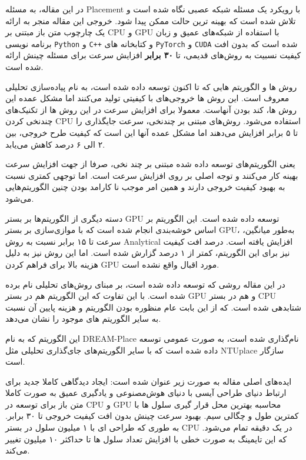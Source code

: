 



در این مقاله، به مسئله Placement با رویکرد یک مسئله شبکه عصبی نگاه شده است و تلاش شده است که بهینه ترین حالت ممکن پیدا شود. خروجی این مقاله منجر به ارائه یک چارچوب متن باز مبتنی بر CPU و GPU با استفاده از شبکه‌های عمیق و زبان برنامه نویسی \texttt{Python} و \texttt{C++} و کتابخانه های \texttt{PyTorch} و \texttt{CUDA} شده است که بدون افت کیفیت نسبیت به روش‌های قدیمی، تا \textbf{۳۰ برابر} افزایش سرعت برای مسئله چینش ارائه شده است.





روش ها و الگوریتم هایی که تا اکنون توسعه داده شده است، به نام پیاده‌سازی تحلیلی معروف است. این روش ها خروجی‌های با کیفیتی تولید می‌کنند اما مشکل عمده این روش ها، کند بودن آنهاست. معمولا برای افزایش سرعت در این روش ها از تکنیک‌های چند‌نخی کردن CPU استفاده می‌شود. روش‌های مبتنی بر چند‌نخی، سرعت جایگذاری را تا ۵ برابر افزایش می‌دهند اما مشکل عمده آنها این است که کیفیت طرح خروجی، بین ۲ الی ۶ درصد کاهش می‌یابد. 

یعنی الگوریتم‌های توسعه داده شده مبتنی بر چند نخی، صرفا از جهت افزایش سرعت بهینه کار می‌کنند و توجه اصلی بر روی افزایش سرعت است. اما توجهی کمتری نسبت به بهبود کیفیت خروجی دارند و همین امر موجب نا کار‌امد بودن چنین الگوریتم‌هایی می‌شود.

دسته دیگری از الگوریتم‌ها بر بستر GPU توسعه داده شده است. این الگوریتم بر اساس خوشه‌بندی انجام شده است که با موازی‌سازی بر بستر GPU، به‌طور میانگین، سرعت تا ۱۵ برابر نسبت به روش Analytical افزایش یافته است. درصد افت کیفیت نیز برای این الگوریتم، کمتر از ۱ درصد گزارش شده است. اما این روش نیز به دلیل هزینه بالا برای فراهم کردن GPU مورد اقبال واقع نشده است. 

در این مقاله روشی که توسعه داده شده است، بر مبنای روش‌های تحلیلی نام برده شده است. با این تفاوت که این الگوریتم هم در بستر GPU و هم در بستر CPU شتابدهی شده است. که از این بابت عام منظوره بودن الگوریتم و هزینه پایین آن نسبت به سایر الگوریتم های موجود را نشان می‌دهد.

این الگوریتم که به نام DREAM-Place نام‌گذاری شده است، به صورت عمومی توسعه داده شده است که با سایر الگوریتم‌های جای‌گذاری تحلیلی مثل NTUplace سازگار است. 

ایده‌های اصلی مقاله به صورت زیر عنوان شده است:
 ایجاد دیدگاهی کاملا جدید برای ارتباط دنیای طراحی آیسی با دنیای هوش‌مصنوعی و یادگیری عمیق به صورت کاملا متن باز برای توسعه در CPU و GPU
 محاسبه بهترین محل قرار گیری سلول ها با کمترین طول و چگالی سیم.
 بهبود سرعت چینش بدون افت کیفیت خروجی تا ۳۰ برابر. به طوری که طراحی ای با ۱ میلیون سلول در بستر CPU در یک دقیقه تمام می‌شود. که این تایمینگ به صورت خطی با افزایش تعداد سلول ها تا حداکثر ۱۰ میلیون تغییر می‌کند.


